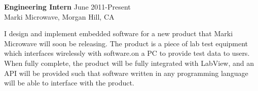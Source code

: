 \textbf{Engineering Intern} \hfill June 2011-Present \\
Marki Microwave, Morgan Hill, CA
\begin{description}  \itemsep -2pt %
\item I design and implement embedded software for a new product that 
Marki Microwave will soon be releasing. The product is a piece of lab
test equipment which interfaces wirelessly with software.on a PC to
provide test data to users. When fully complete, the product will be
fully integrated with LabView, and an API will be provided such that
software written in any programming language will be able to interface
with the product.
\end{description}
